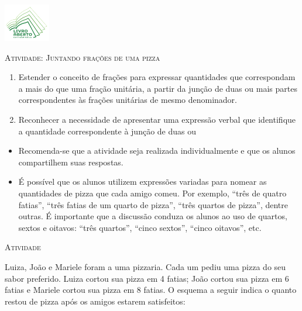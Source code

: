 \documentclass[10 pt,usenames,dvipsnames, oneside]{article}
\begin{document}
\begin{center}
  \begin{minipage}[l]{3cm}
\includegraphics[width=2cm]{../../../Figuras/logo}    
\end{minipage}\hfill
\begin{minipage}[r]{.8\textwidth}
 {\Large \scshape Atividade: Juntando frações de uma pizza}  
\end{minipage}
\end{center}
\vspace{.2cm}

\ifdefined\prof
\begin{goals}
\begin{enumerate}

\item Estender o conceito de frações para expressar quantidades que correspondam a mais do que uma fração unitária, a partir da junção de duas ou mais partes correspondentes às frações unitárias de mesmo denominador.
\item Reconhecer a necessidade de apresentar uma expressão verbal que identifique a quantidade correspondente à junção de duas ou

\end{enumerate}
\tcblower

  \begin{itemize} %
\item Recomenda-se que a atividade seja realizada individualmente e que os alunos compartilhem suas respostas. 
\item É possível que os alunos utilizem expressões variadas para nomear as quantidades de pizza que cada amigo comeu. Por exemplo, ``três de quatro fatias'', ``três fatias de um quarto de pizza'', ``três quartos de pizza'', dentre outras. É importante que a discussão conduza os alunos ao uso de quartos, sextos e oitavos: ``três quartos'', ``cinco sextos'', ``cinco oitavos'', etc. 
\end{itemize} %


\end{goals}

\bigskip
\begin{center}
{\large \scshape Atividade}
\end{center}
\fi

Luiza, João e Mariele foram a uma pizzaria. Cada um pediu uma pizza do seu sabor preferido. 
Luiza cortou sua pizza em 4 fatias; João cortou sua pizza em 6 fatias e Mariele cortou sua pizza em 8 fatias.
O esquema a seguir indica o quanto restou de pizza após os amigos estarem satisfeitos:
\end{document}
